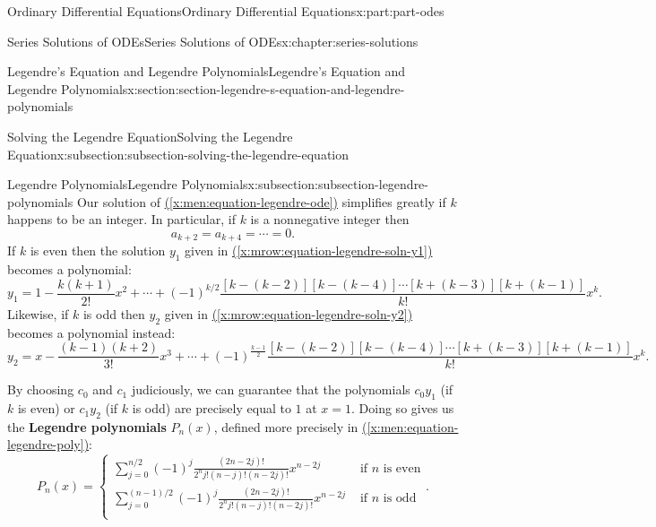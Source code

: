 \documentclass[twoside,10pt,]{book}
\newcommand{\xreffont}{\relax}
\newcommand{\terminology}[1]{\textbf{#1}}
\numberwithin{equation}{part}
\newcommand{\amp}{&}
\begin{document}
\begin{partptx}{Ordinary Differential Equations}{}{Ordinary Differential Equations}{}{}{x:part:part-odes}
\begin{chapterptx}{Series Solutions of ODEs}{}{Series Solutions of ODEs}{}{}{x:chapter:series-solutions}
\begin{sectionptx}{Legendre's Equation and Legendre Polynomials}{}{Legendre's Equation and Legendre Polynomials}{}{}{x:section:section-legendre-s-equation-and-legendre-polynomials}
\begin{subsectionptx}{Solving the Legendre Equation}{}{Solving the Legendre Equation}{}{}{x:subsection:subsection-solving-the-legendre-equation}
\end{subsectionptx}
%
%
\typeout{************************************************}
\typeout{************************************************}
%
\begin{subsectionptx}{Legendre Polynomials}{}{Legendre Polynomials}{}{}{x:subsection:subsection-legendre-polynomials}
Our solution of \hyperref[x:men:equation-legendre-ode]{({\xreffont\ref{x:men:equation-legendre-ode}})} simplifies greatly if \(k\) happens to be an integer. In particular, if \(k\) is a nonnegative integer then%
\begin{equation*}
a_{k+2} = a_{k+4} = \cdots = 0\text{.}
\end{equation*}
If \(k\) is even then the solution \(y_{1}\) given in \hyperref[x:mrow:equation-legendre-soln-y1]{({\xreffont\ref{x:mrow:equation-legendre-soln-y1}})} becomes a polynomial:%
\begin{equation*}
y_{1} = 1 - \frac{k(k+1)}{2!}x^{2} + \cdots + (-1)^{k/2}\frac{[k - (k-2)][k - (k-4)]\cdots[k + (k-3)][k + (k-1)]}{k!}x^{k}\text{.}
\end{equation*}
Likewise, if \(k\) is odd then \(y_{2}\) given in \hyperref[x:mrow:equation-legendre-soln-y2]{({\xreffont\ref{x:mrow:equation-legendre-soln-y2}})} becomes a polynomial instead:%
\begin{equation*}
y_{2} = x - \frac{(k-1)(k+2)}{3!}x^{3} + \cdots + (-1)^{\frac{k-1}{2}}\frac{[k - (k - 2)][k - (k - 4)]\cdots[k + (k - 3)][k + (k - 1)]}{k!}x^{k}\text{.}
\end{equation*}
%
\par
By choosing \(c_{0}\) and \(c_{1}\) judiciously, we can guarantee that the polynomials \(c_{0}y_{1}\) (if \(k\) is even) or \(c_{1}y_{2}\) (if \(k\) is odd) are precisely equal to \(1\) at \(x = 1\). Doing so gives us the \terminology{Legendre polynomials} \(P_{n}(x)\), defined more precisely in \hyperref[x:men:equation-legendre-poly]{({\xreffont\ref{x:men:equation-legendre-poly}})}:%
\begin{equation}
P_{n}(x) = \begin{cases} \sum_{j = 0}^{n/2}(-1)^{j}\frac{(2n - 2j)!}{2^{n}j!(n - j)!(n - 2j)!}x^{n - 2j} \amp \text{ if }n\text{ is even} \\
\sum_{j = 0}^{(n-1)/2}(-1)^{j}\frac{(2n - 2j)!}{2^{n}j!(n - j)!(n - 2j)!}x^{n - 2j} \amp \text{ if }n\text{ is odd} \\ \end{cases}\text{.}\label{x:men:equation-legendre-poly}
\end{equation}

\end{subsectionptx}
\end{sectionptx}
\end{chapterptx}
\end{partptx}
\end{document}
